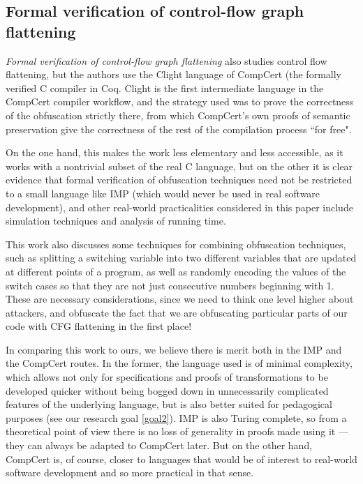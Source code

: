 \documentclass[compsoc,conference,a4paper,10pt,times]{IEEEtran}
\begin{document}
\subsection*{Formal verification of control-flow graph flattening}
\par \emph{Formal verification of control-flow graph flattening} \cite{Blazy2} also studies control flow flattening, but the authors use the Clight language of CompCert \cite{CompCert}(the formally verified C compiler in Coq.
Clight is the first intermediate language in the CompCert compiler workflow, and the strategy used was to prove the correctness of the obfuscation strictly there, from which CompCert's own proofs of semantic preservation give the correctness of the rest of the compilation process ``for free".
\par On the one hand, this makes the work less elementary and less accessible, as it works with a nontrivial subset of the real C language, but on the other it is clear evidence that formal verification of obfuscation techniques need not be restricted to a small language like IMP (which would never be used in real software development), and other real-world practicalities considered in this paper include simulation techniques and analysis of running time.
\par This work also discusses some techniques for combining obfuscation techniques, such as splitting a switching variable into two different variables that are updated at different points of a program, as well as randomly encoding the values of the switch cases so that they are not just consecutive numbers beginning with 1.  These are necessary considerations, since we need to think one level higher about attackers, and obfuscate the fact that we are obfuscating particular parts of our code with CFG flattening in the first place!
\par In comparing this work to ours, we believe there is merit both in the IMP and the CompCert routes.  In the former, the language used is of minimal complexity, which allows not only for specifications and proofs of transformations to be developed quicker without being bogged down in unnecessarily complicated features of the underlying language, but is also better suited for pedagogical purposes (see our research goal \ref{goal2}). IMP is also Turing complete, so from a theoretical point of view there is no loss of generality in proofs made using it --- they can always be adapted to CompCert later.  But on the other hand, CompCert is, of course, closer to languages that would be of interest to real-world software development and so more practical in that sense.
\end{document}
